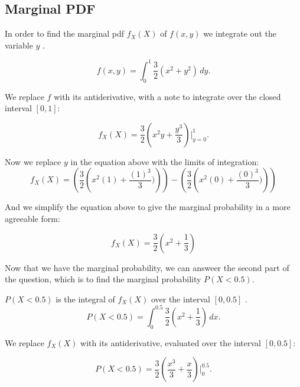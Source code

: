 \documentclass[a4paper,11pt]{article}
\begin{document}
\subsection{Marginal PDF}

In order to find the marginal pdf $f_{X}\left(X \right)$ of
$f\left( x, y \right)$ we integrate out the variable $y$ \cite{reading7}.

\begin{equation}
  f\left( x, y \right) = \int_0^1 \frac{3}{2}\left( x^2 + y^2 \right) \,dy.
\end{equation}

We replace $f$ with its antiderivative, with a note to integrate over the
closed interval $\left[ 0 , 1\right]$:

\begin{equation}
  f_{X}\left(X \right) =  \frac{3}{2}\left( x^{2}y + \frac{y^3}{3} \right)
  \bigg\rvert_{y=0}^1.
\end{equation}

Now we replace $y$ in the equation above with the limits of integration:
\begin{equation}
  f_{X}\left(X \right) = \left( \frac{3}{2} \left( x^2 \left(1 \right)
      + \frac{ \left(1 \right)^3}{3}) \right) \right)
  - \left( \frac{3}{2} \left( x^2 \left(0 \right)
      + \frac{ \left(0 \right)^3}{3}) \right) \right)
\end{equation}

And we simplify the equation above to give the marginal probability in a more
agreeable form:

\begin{equation}
  f_{X}\left(X \right) = \frac{3}{2} \left( x^2 + \frac{1}{3} \right)
\end{equation}

Now that we have the marginal probability, we can answeer the second part of
the question, which is to find the marginal probability
$P \left( X < 0.5 \right)$.

$P \left( X < 0.5 \right)$ is the integral of $f_{X}\left(X \right)$ over the
interval $\left[0, 0.5 \right]$ \cite{reading7}.
\begin{equation}
  P \left( X < 0.5 \right) = \int_0^{0.5}
   \frac{3}{2} \left( x^2 + \frac{1}{3} \right) \,dx.
\end{equation}

We replace $f_{X}\left( X \right)$ with its antiderivative, evaluated over
the interval $\left[0, 0.5 \right]$:

\begin{equation}
  P \left( X < 0.5 \right) =
   \frac{3}{2} \left( \frac{x^3}{3} + \frac{x}{3} \right) \bigg\rvert_0^{0.5}.
\end{equation}
\end{document}
